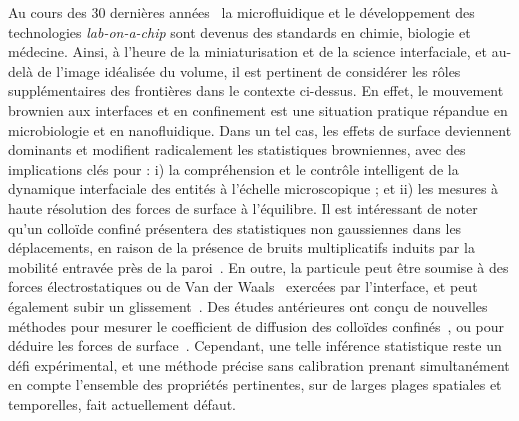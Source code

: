 Au cours des 30 dernières années~\cite{whitesides_origins_2006, convery_30_2019} la microfluidique et le développement des technologies \textit{lab-on-a-chip} \cite{neuzil_revisiting_2012,ding_surface_2013} sont devenus des standards en chimie, biologie et médecine. Ainsi, à l'heure de la miniaturisation et de la science interfaciale, et au-delà de l'image idéalisée du volume, il est pertinent de considérer les rôles supplémentaires des frontières dans le contexte ci-dessus. En effet, le mouvement brownien aux interfaces et en confinement est une situation pratique répandue en microbiologie et en nanofluidique. Dans un tel cas, les effets de surface deviennent dominants et modifient radicalement les statistiques browniennes, avec des implications clés pour : i) la compréhension et le contrôle intelligent de la dynamique interfaciale des entités à l'échelle microscopique ; et ii) les mesures à haute résolution des forces de surface à l'équilibre. Il est intéressant de noter qu'un colloïde confiné présentera des statistiques non gaussiennes dans les déplacements, en raison de la présence de bruits multiplicatifs induits par la mobilité entravée près de la paroi~\cite{felderhof_effect_2005,wang_anomalous_2009,chechkin_brownian_2017}. En outre, la particule peut être soumise à des forces électrostatiques ou de Van der Waals~\cite{bouzigues_nanofluidics_2008} exercées par l'interface, et peut également subir un glissement~\cite{joly_probing_2006,mo_brownian_2017}. Des études antérieures ont conçu de nouvelles méthodes pour mesurer le coefficient de diffusion des colloïdes confinés~\cite{faucheux_confined_1994,dufresne_brownian_2001,carbajal-tinoco_asymmetry_2007,eral_anisotropic_2010,sharma_high-precision_2010, mo_broadband_2015,matse_test_2017}, ou pour déduire les forces de surface~\cite{prieve_measurement_1999,banerjee_experimental_2005,sainis_statistics_2007,volpe_influence_2010,wang_measurement_2011,li_subfemtonewton_2019}. Cependant, une telle inférence statistique reste un défi expérimental, et une méthode précise sans calibration prenant simultanément en compte l'ensemble des propriétés pertinentes, sur de larges plages spatiales et temporelles, fait actuellement défaut.

